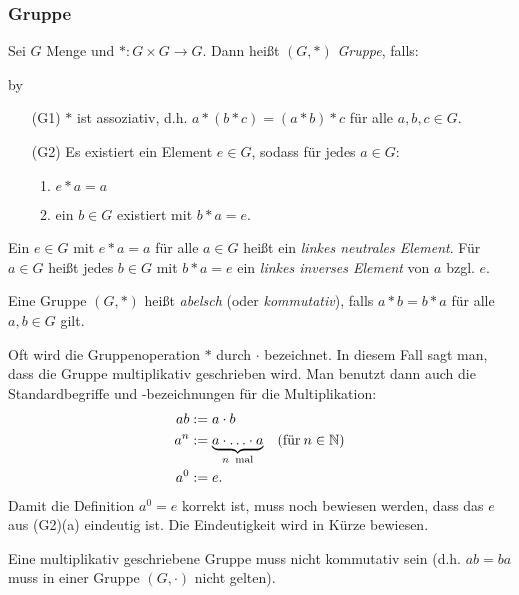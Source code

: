 \subsubsection{Gruppe}

Sei $ G $ Menge und $ \ast : G \times G \to G $. Dann heißt $ (G,\ast) $ \emph{Gruppe}, falls:

\advance\myindent by \the{}

\begin{itemize}[leftmargin=\myindent]
	\item[(G1)] $ \ast $ ist assoziativ, d.h. $ a \ast ( b \ast c ) = ( a \ast b ) \ast c $ für alle $ a,b,c \in G $.
	\item[(G2)] Es existiert ein Element $ e \in G $, sodass für jedes $ a \in G $:
	\begin{enumerate}[label={(\alph*)}]
		\item $ e \ast a = a $
		\item ein $ b \in G $ existiert mit $ b \ast a = e $.
	\end{enumerate}
\end{itemize}
Ein $ e \in G $ mit $ e \ast a = a $ für alle $ a \in G $ heißt ein \emph{linkes neutrales Element}. Für $ a \in G $ heißt jedes $ b \in G $ mit $ b \ast a = e $ ein \emph{linkes inverses Element} von $ a $ bzgl. $ e $.

Eine Gruppe $ (G,\ast) $ heißt \emph{abelsch} (oder \emph{kommutativ}), falls $ a \ast b = b \ast a $ für alle $ a,b \in G $ gilt.

\begin{bem}
	Oft wird die Gruppenoperation $ \ast $ durch $ \cdot $ bezeichnet. In diesem Fall sagt man, dass die Gruppe multiplikativ geschrieben wird. Man benutzt dann auch die Standardbegriffe und -bezeichnungen für die Multiplikation:
	\begin{align}
		ab &:= a \cdot b \\
		a^n &:= \underbrace{a \cdot \ldots \cdot a}_{n \text{\: mal}} \quad (\text{für}\: n \in \mathbb N) \\
		a^0 &:= e.
	\end{align}
	Damit die Definition $a^0 = e $ korrekt ist, muss noch bewiesen werden, dass das $e$ aus (G2)(a) eindeutig ist. Die Eindeutigkeit wird in Kürze bewiesen. 
	
	Eine multiplikativ geschriebene Gruppe muss nicht kommutativ sein (d.h. $ ab = ba $ muss in einer Gruppe $(G, \cdot)$ nicht gelten).
\end{bem}


